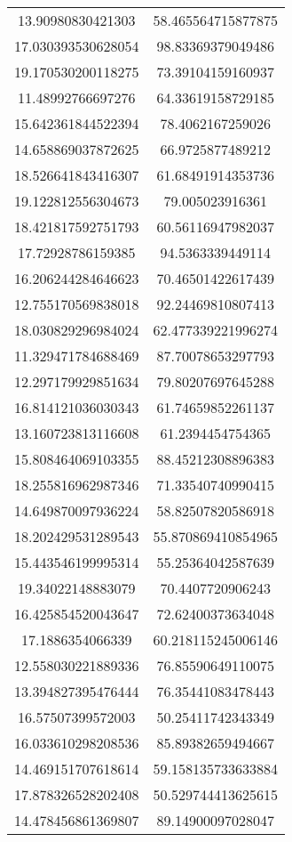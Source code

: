 \begin{table}
\begin{tabular}{cc}
13.90980830421303 & 58.465564715877875 \\
17.030393530628054 & 98.83369379049486 \\
19.170530200118275 & 73.39104159160937 \\
11.48992766697276 & 64.33619158729185 \\
15.642361844522394 & 78.4062167259026 \\
14.658869037872625 & 66.9725877489212 \\
18.526641843416307 & 61.68491914353736 \\
19.122812556304673 & 79.005023916361 \\
18.421817592751793 & 60.56116947982037 \\
17.72928786159385 & 94.5363339449114 \\
16.206244284646623 & 70.46501422617439 \\
12.755170569838018 & 92.24469810807413 \\
18.030829296984024 & 62.477339221996274 \\
11.329471784688469 & 87.70078653297793 \\
12.297179929851634 & 79.80207697645288 \\
16.814121036030343 & 61.74659852261137 \\
13.160723813116608 & 61.2394454754365 \\
15.808464069103355 & 88.45212308896383 \\
18.255816962987346 & 71.33540740990415 \\
14.649870097936224 & 58.82507820586918 \\
18.202429531289543 & 55.870869410854965 \\
15.443546199995314 & 55.25364042587639 \\
19.34022148883079 & 70.4407720906243 \\
16.425854520043647 & 72.62400373634048 \\
17.1886354066339 & 60.218115245006146 \\
12.558030221889336 & 76.85590649110075 \\
13.394827395476444 & 76.35441083478443 \\
16.57507399572003 & 50.25411742343349 \\
16.033610298208536 & 85.89382659494667 \\
14.469151707618614 & 59.158135733633884 \\
17.878326528202408 & 50.529744413625615 \\
14.478456861369807 & 89.14900097028047 \\

\end{tabular}
\end{table}
